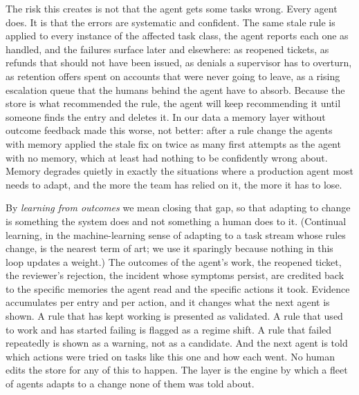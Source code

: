 \documentclass[11pt]{article}
\begin{document}
The risk this creates is not that the agent gets some tasks wrong. Every agent does. It is that
the errors are systematic and confident. The same stale rule is applied to every instance of the
affected task class, the agent reports each one as handled, and the failures surface later and
elsewhere: as reopened tickets, as refunds that should not have been issued, as denials a
supervisor has to overturn, as retention offers spent on accounts that were never going to
leave, as a rising escalation queue that the humans behind the agent have to absorb. Because
the store is what recommended the rule, the agent will keep recommending it until someone finds
the entry and deletes it. In our data a memory layer without outcome feedback made this worse,
not better: after a rule change the agents with memory applied the stale fix on twice as many
first attempts as the agent with no memory, which at least had nothing to be confidently wrong
about. Memory degrades quietly in exactly the situations where a production agent most needs
to adapt, and the more the team has relied on it, the more it has to lose.

By \emph{learning from outcomes} we mean closing that gap, so that adapting to change is
something the system does and not something a human does to it. (Continual learning, in the
machine-learning sense of adapting to a task stream whose rules change, is the nearest term
of art; we use it sparingly because nothing in this loop updates a weight.) The outcomes of
the agent's work, the
reopened ticket, the reviewer's rejection, the incident whose symptoms persist, are credited
back to the specific memories the agent read and the specific actions it took. Evidence
accumulates per entry and per action, and it changes what the next agent is shown. A rule that
has kept working is presented as validated. A rule that used to work and has started failing
is flagged as a regime shift. A rule that failed repeatedly is shown as a warning, not as a
candidate. And the next agent is told which actions were tried on tasks like this one and how
each went. No human edits the store for any of this to happen. The layer is the engine by which
a fleet of agents adapts to a change none of them was told about.
\end{document}
